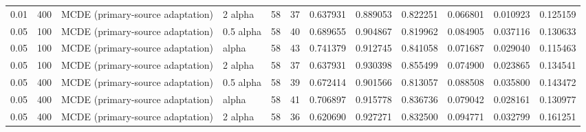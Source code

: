 \begin{tabular}{llllllllllll}
0.01 & 400 & MCDE (primary-source adaptation) & 2 alpha & 58 & 37 & 0.637931 & 0.889053 & 0.822251 & 0.066801 & 0.010923 & 0.125159 \\
0.05 & 100 & MCDE (primary-source adaptation) & 0.5 alpha & 58 & 40 & 0.689655 & 0.904867 & 0.819962 & 0.084905 & 0.037116 & 0.130633 \\
0.05 & 100 & MCDE (primary-source adaptation) & alpha & 58 & 43 & 0.741379 & 0.912745 & 0.841058 & 0.071687 & 0.029040 & 0.115463 \\
0.05 & 100 & MCDE (primary-source adaptation) & 2 alpha & 58 & 37 & 0.637931 & 0.930398 & 0.855499 & 0.074900 & 0.023865 & 0.134541 \\
0.05 & 400 & MCDE (primary-source adaptation) & 0.5 alpha & 58 & 39 & 0.672414 & 0.901566 & 0.813057 & 0.088508 & 0.035800 & 0.143472 \\
0.05 & 400 & MCDE (primary-source adaptation) & alpha & 58 & 41 & 0.706897 & 0.915778 & 0.836736 & 0.079042 & 0.028161 & 0.130977 \\
0.05 & 400 & MCDE (primary-source adaptation) & 2 alpha & 58 & 36 & 0.620690 & 0.927271 & 0.832500 & 0.094771 & 0.032799 & 0.161251 \\
\bottomrule
\end{tabular}
